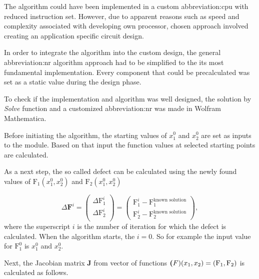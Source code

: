 \documentclass[a4paper, twoside, 11pt]{article}
\begin{document}
        \par
        The algorithm could have been implemented in a custom \gls{abbreviation:cpu} with reduced instruction set. However, due to apparent reasons such as speed and complexity associated with developing own processor, chosen approach involved creating an application specific circuit design.\par
        In order to integrate the algorithm into the custom design, the general \gls{abbreviation:nr} algorithm approach had to be simplified to the its most fundamental implementation. Every component that could be precalculated was set as a static value during the design phase.\par
        To check if the implementation and algorithm was well designed, the solution by \textit{Solve} function and a customized \gls{abbreviation:nr} was made in Wolfram Mathematica.\par
        Before initiating the algorithm, the starting values of $x_1^0$ and $x_2^0$ are set as inputs to the module. Based on that input the function values at selected starting points are calculated.\par
        As a next step, the so called defect can be calculated using the newly found values of $\text{F}_1 (x_1^0, x_2^0)$ and $\text{F}_2 (x_1^0, x_2^0)$

        \begin{equation}
            \Delta \textbf{F}^i =
            \begin{pmatrix}
                \Delta \text{F}_1^i\\
                \Delta \text{F}_2^i\\
            \end{pmatrix}
            =
            \begin{pmatrix}
                \text{F}_1^i - \text{F}_1^{\text{known solution}}\\
                \text{F}_2^i - \text{F}_2^{\text{known solution}}
            \end{pmatrix},
        \end{equation}
        where the superscript $i$ is the number of iteration for which the defect is calculated. When the algorithm starts, the $i = 0$. So for example the input value for $\text{F}_1^0$ is $x_1^0$ and $x_2^0$.\par
        Next, the Jacobian matrix \textbf{J} from vector of functions $\textbf(F)(x_1, x_2) = (\text{F}_1, \text{F}_2)$ is calculated as follows.
\end{document}
